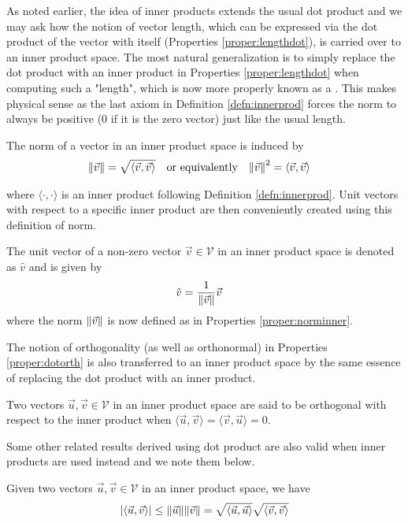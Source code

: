 As noted earlier, the idea of inner products extends the usual dot product and we may ask how the notion of vector length, which can be expressed via the dot product of the vector with itself (Properties \ref{proper:lengthdot}), is carried over to an inner product space. The most natural generalization is to simply replace the dot product with an inner product in Properties \ref{proper:lengthdot} when computing such a "length", which is now more properly known as a . This makes physical sense as the last axiom in Definition \ref{defn:innerprod} forces the norm to always be positive ($0$ if it is the zero vector) just like the usual length.
\begin{proper}
\label{proper:norminner}
The norm of a vector in an inner product space is induced by
\begin{align}
\norm{\vec{v}} &= \sqrt{\langle\vec{v} , \vec{v}\rangle} & &\text{or equivalently} &
\norm{\vec{v}}^2 &= \langle\vec{v} , \vec{v}\rangle
\end{align}
\end{proper}
where $\langle \cdot, \cdot \rangle$ is an inner product following Definition \ref{defn:innerprod}.
Unit vectors with respect to a specific inner product are then conveniently created using this definition of norm.
\begin{defn}
\label{defn:unitvecinner}
The unit vector of a non-zero vector $\vec{v} \in \mathcal{V}$ in an inner product space is denoted as $\hat{v}$ and is given by
\begin{align}
\hat{v} &= \frac{1}{\norm{\vec{v}}}\vec{v}
\end{align}
where the norm $\norm{\vec{v}}$ is now defined as in Properties \ref{proper:norminner}. 
\end{defn}
The notion of orthogonality (as well as orthonormal) in Properties \ref{proper:dotorth} is also transferred to an inner product space by the same essence of replacing the dot product with an inner product.
\begin{proper}
\label{proper:orthoinner}
Two vectors $\vec{u}, \vec{v} \in \mathcal{V}$ in an inner product space are said to be orthogonal with respect to the inner product when $\langle\vec{u}, \vec{v}\rangle = \langle\vec{v}, \vec{u}\rangle = 0$.
\end{proper}
Some other related results derived using dot product are also valid when inner products are used instead and we note them below.
\begin{thm}
\label{thm:cauchyschinner}
Given two vectors $\vec{u}, \vec{v} \in \mathcal{V}$ in an inner product space, we have
\begin{align}
\abs{\langle\vec{u} , \vec{v}\rangle} \leq \norm{\vec{u}}\norm{\vec{v}} =  \sqrt{\langle\vec{u} , \vec{u}\rangle} \sqrt{\langle\vec{v} , \vec{v}\rangle}
\end{align}
\end{thm}
